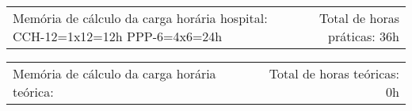{\fontsize{10pt}{12pt}\selectfont
\noindent
\begin{tabularx}{\linewidth}{@{}X r@{}}
Memória de cálculo da carga horária hospital:
CCH-12=1x12=12h
PPP-6=4x6=24h&
Total de horas práticas: 36h\\
\end{tabularx}
\noindent
\begin{tabularx}{\linewidth}{@{}X r@{}}
Memória de cálculo da carga horária teórica: 
 &
Total de horas teóricas: 0h
\end{tabularx}
}